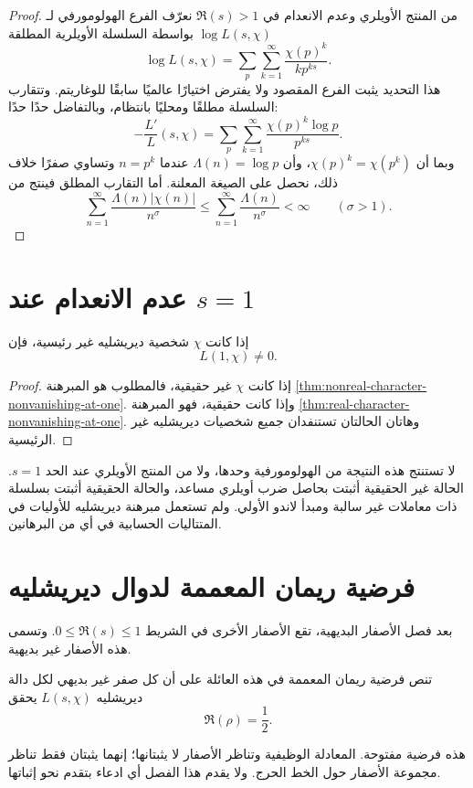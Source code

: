 \begin{proof}
من المنتج الأويلري وعدم الانعدام في \(\Re(s)>1\) نعرّف الفرع الهولومورفي
لـ\(\log L(s,\chi)\) بواسطة السلسلة الأويلرية المطلقة
\[
\log L(s,\chi)
=
\sum_p\sum_{k=1}^{\infty}
\frac{\chi(p)^k}{k p^{ks}}.
\]
هذا التحديد يثبت الفرع المقصود ولا يفترض اختيارًا عالميًا سابقًا
للوغاريتم. وتتقارب السلسلة مطلقًا ومحليًا بانتظام، وبالتفاضل حدًا حدًا:
\[
-\frac{L'}{L}(s,\chi)
=
\sum_p\sum_{k=1}^{\infty}
\frac{\chi(p)^k\log p}{p^{ks}}.
\]
وبما أن \(\chi(p)^k=\chi(p^k)\)، وأن
\(\Lambda(n)=\log p\) عندما \(n=p^k\) وتساوي صفرًا خلاف ذلك، نحصل على
الصيغة المعلنة. أما التقارب المطلق فينتج من
\[
\sum_{n=1}^{\infty}\frac{\Lambda(n)|\chi(n)|}{n^\sigma}
\leq
\sum_{n=1}^{\infty}\frac{\Lambda(n)}{n^\sigma}
<\infty
\qquad(\sigma>1).
\]
\end{proof}

\section{عدم الانعدام عند \(s=1\)}

\begin{theorem}
\label{thm:dirichlet-l-nonvanishing-at-one}
\provedhere
إذا كانت \(\chi\) شخصية ديريشليه غير رئيسية، فإن
\[
L(1,\chi)\ne0.
\]
\end{theorem}

\begin{proof}
إذا كانت \(\chi\) غير حقيقية، فالمطلوب هو المبرهنة
\ref{thm:nonreal-character-nonvanishing-at-one}. وإذا كانت حقيقية، فهو
المبرهنة \ref{thm:real-character-nonvanishing-at-one}. وهاتان الحالتان
تستنفدان جميع شخصيات ديريشليه غير الرئيسية.
\end{proof}

\begin{remark}
لا تستنتج هذه النتيجة من الهولومورفية وحدها، ولا من المنتج الأويلري عند
الحد \(s=1\). الحالة غير الحقيقية أثبتت بحاصل ضرب أويلري مساعد، والحالة
الحقيقية أثبتت بسلسلة ذات معاملات غير سالبة ومبدأ لاندو الأولي. ولم تستعمل
مبرهنة ديريشليه للأوليات في المتتاليات الحسابية في أي من البرهانين.
\end{remark}

\section{فرضية ريمان المعممة لدوال ديريشليه}

بعد فصل الأصفار البديهية، تقع الأصفار الأخرى في الشريط
\(0\leq\Re(s)\leq1\). وتسمى هذه الأصفار غير بديهية.

\begin{definition}
تنص فرضية ريمان المعممة في هذه العائلة على أن كل صفر غير بديهي لكل دالة
ديريشليه \(L(s,\chi)\) يحقق
\[
\Re(\rho)=\frac12.
\]
\end{definition}

هذه فرضية مفتوحة. المعادلة الوظيفية وتناظر الأصفار لا يثبتانها؛ إنهما
يثبتان فقط تناظر مجموعة الأصفار حول الخط الحرج. ولا يقدم هذا الفصل أي
ادعاء بتقدم نحو إثباتها.
